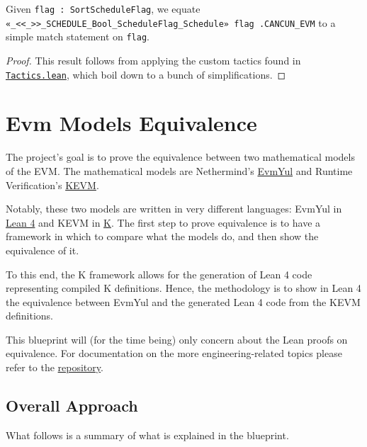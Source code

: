 \begin{theorem}
\label{thm:flag_cancun_def}\leanok{}
Given \texttt{flag : SortScheduleFlag}, we equate
\texttt{«_<<_>>_SCHEDULE_Bool_ScheduleFlag_Schedule» flag .CANCUN_EVM} to a
simple match statement on \texttt{flag}.
\end{theorem}
\begin{proof}
\leanok
This result follows from applying the custom tactics found in
\href{https://runtimeverification.github.io/evm-equivalence/docs/EvmEquivalence/Interfaces/Tactics.html}{\texttt{Tactics.lean}},
which boil down to a bunch of simplifications.
\end{proof}


\chapter*{Evm Models Equivalence}\label{evm-equiv-intro}

The project's goal is to prove the equivalence between two mathematical models of the EVM.
The mathematical models are Nethermind's \href{https://github.com/nethermindEth/EVMYulLean/}{EvmYul}
and Runtime Verification's \href{https://github.com/runtimeverification/evm-semantics}{KEVM}.

Notably, these two models are written in very different languages: EvmYul in
\href{https://lean-lang.org}{Lean 4} and KEVM in \href{https://kframework.org}{K}.
The first step to prove equivalence is to have a framework in which to compare
what the models do, and then show the equivalence of it.

To this end, the K framework allows for the generation of Lean 4 code
representing compiled K definitions.
Hence, the methodology is to show in Lean 4 the equivalence between EvmYul and
the generated Lean 4 code from the KEVM definitions.

This blueprint will (for the time being) only concern about the Lean proofs on
equivalence. For documentation on the more engineering-related topics please
refer to the
\href{https://github.com/runtimeverification/evm-equivalence}{repository}.

\section*{Overall Approach}

What follows is a summary of what is explained in the blueprint.

